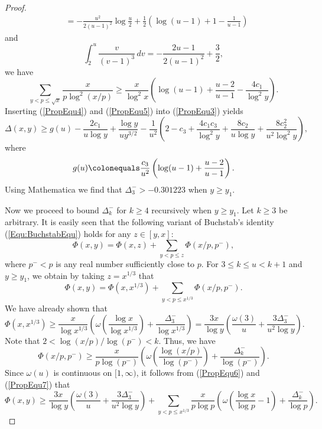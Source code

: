 \documentclass[12pt,reqno]{amsart}
\begin{document}
\begin{proof}
\begin{align*}
&=-\frac{u^2}{2(u-1)^2}\log\frac{u}{2}+\frac{1}{2}\left(\log(u-1)+1-\frac{1}{u-1}\right)
\end{align*}
and 
\[\int_{2}^{u}\frac{v}{(v-1)^3}\,dv=-\frac{2u-1}{2(u-1)^2}+\frac{3}{2},\]
we have
\begin{equation}\label{PropEqu5}
\sum_{y<p\le \sqrt{x}}\frac{x}{p\log^2(x/p)}\ge\frac{x}{\log^2 x}\left(\log(u-1)+\frac{u-2}{u-1}-\frac{4c_1}{\log^2y}\right).
\end{equation}
Inserting (\ref{PropEqu4}) and (\ref{PropEqu5}) into (\ref{PropEqu3}) yields
\[\Delta(x,y)\ge g(u)-\frac{2c_1}{u\log y}+\frac{\log y}{uy^{3/2}}-\frac{1}{u^2}\left(2-c_3+\frac{4c_1c_3}{\log^2 y}+\frac{8c_2}{u\log y}+\frac{8c_2^2}{u^2\log^2 y}\right),\]
where
\[g(u)\colonequals \frac{c_3}{u^2}\left(\log(u-1)+\frac{u-2}{u-1}\right).\]
Using Mathematica we find that $\Delta_3^->-0.301223$ when $y\ge y_1$.
\par Now we proceed to  bound $\Delta_k^-$ for $k\ge4$ recursively when $y\ge y_1$. Let $k\ge3$ be arbitrary. It is easily seen that the following variant of Buchstab's identity (\ref{Equ:BuchstabEqu}) holds for any $z\in[y,x]$:
\begin{equation}\label{Equ:VBuchstab}
\Phi(x,y)=\Phi(x,z)+\sum_{y<p\le z}\Phi(x/p,p^-),
\end{equation}
where $p^-<p$ is any real number sufficiently close to $p$. For $3\le k\le u<k+1$ and $y\ge y_1$, we obtain by taking $z=x^{1/3}$ that
\begin{equation}\label{PropEqu6}
\Phi(x,y)=\Phi\left(x,x^{1/3}\right)+\sum_{y<p\le x^{1/3}}\Phi(x/p,p^-).
\end{equation}
We have already shown that
\begin{equation}\label{PropEqu7}
\Phi\left(x,x^{1/3}\right)\ge\frac{x}{\log x^{1/3}}\left(\omega\left(\frac{\log x}{\log x^{1/3}}\right)+\frac{\Delta_3^-}{\log x^{1/3}}\right)=\frac{3x}{\log y}\left(\frac{\omega(3)}{u}+\frac{3\Delta_3^-}{u^2\log y}\right).
\end{equation}
Note that $2<\log(x/p)/\log(p^-)<k$. Thus, we have 
\[\Phi(x/p,p^-)\ge\frac{x}{p\log(p^-)}\left(\omega\left(\frac{\log(x/p)}{\log(p^-)}\right)+\frac{\Delta_k^-}{\log(p^-)}\right).\]
Since $\omega(u)$ is continuous on $[1,\infty)$, it follows from (\ref{PropEqu6}) and (\ref{PropEqu7}) that
\begin{equation}\label{PropEqu8}
\Phi(x,y)\ge\frac{3x}{\log y}\left(\frac{\omega(3)}{u}+\frac{3\Delta_3^-}{u^2\log y}\right)+\sum_{y<p\le x^{1/3}}\frac{x}{p\log p}\left(\omega\left(\frac{\log x}{\log p}-1\right)+\frac{\Delta_k^-}{\log p}\right).

\end{equation}
\end{proof}
\end{document}
